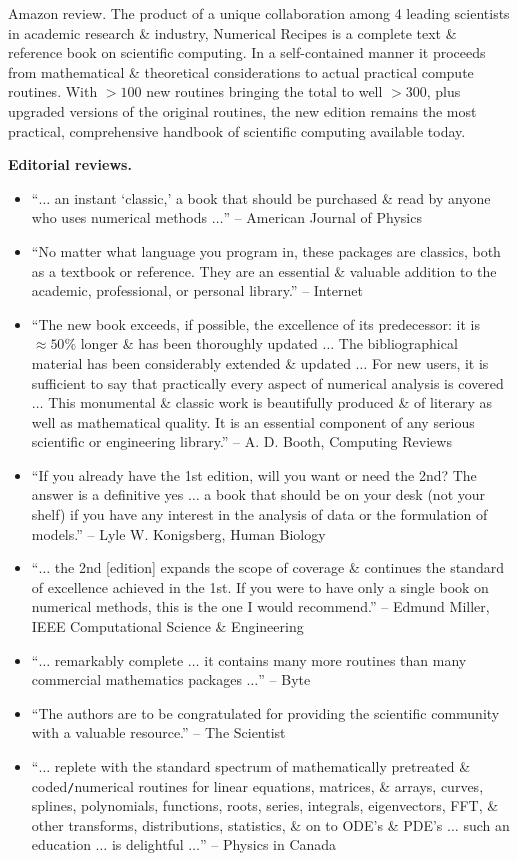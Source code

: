\documentclass{article}
\begin{document}
\begin{enumerate}
	{\sf Amazon review.} The product of a unique collaboration among 4 leading scientists in academic research \& industry, Numerical Recipes is a complete text \& reference book on scientific computing. In a self-contained manner it proceeds from mathematical \& theoretical considerations to actual practical compute routines. With $> 100$ new routines bringing the total to well $> 300$, plus upgraded versions of the original routines, the new edition remains the most practical, comprehensive handbook of scientific computing available today.
	
	{\bf Editorial reviews.}
	\begin{itemize}
		\item ``$\ldots$ an instant `classic,' a book that should be purchased \& read by anyone who uses numerical methods $\ldots$'' -- American Journal of Physics
		\item ``No matter what language you program in, these packages are classics, both as a textbook or reference. They are an essential \& valuable addition to the academic, professional, or personal library.'' -- Internet
		\item ``The new book exceeds, if possible, the excellence of its predecessor: it is $\approx50\%$ longer \& has been thoroughly updated $\ldots$ The bibliographical material has been considerably extended \& updated $\ldots$ For new users, it is sufficient to say that practically every aspect of numerical analysis is covered $\ldots$ This monumental \& classic work is beautifully produced \& of literary as well as mathematical quality. It is an essential component of any serious scientific or engineering library.'' -- {\sc A. D. Booth}, Computing Reviews
		\item ``If you already have the 1st edition, will you want or need the 2nd? The answer is a definitive yes $\ldots$ a book that should be on your desk (not your shelf) if you have any interest in the analysis of data or the formulation of models.'' -- {\sc  Lyle W. Konigsberg}, Human Biology
		\item ``$\ldots$ the 2nd [edition] expands the scope of coverage \& continues the standard of excellence achieved in the 1st. If you were to have only a single book on numerical methods, this is the one I would recommend.'' -- {\sc Edmund Miller}, IEEE Computational Science \& Engineering
		\item ``$\ldots$ remarkably complete $\ldots$ it contains many more routines than many commercial mathematics packages $\ldots$'' -- Byte
		\item ``The authors are to be congratulated for providing the scientific community with a valuable resource.'' -- The Scientist
		\item ``$\ldots$ replete with the standard spectrum of mathematically pretreated \& coded{\tt/}numerical routines for linear equations, matrices, \& arrays, curves, splines, polynomials, functions, roots, series, integrals, eigenvectors, FFT, \& other transforms, distributions, statistics, \& on to ODE's \& PDE's $\ldots$ such an education $\ldots$ is delightful $\ldots$'' -- Physics in Canada
	\end{itemize}
	

\end{enumerate}
\end{document}
